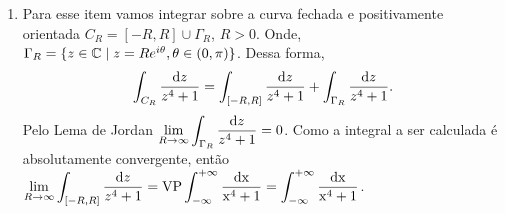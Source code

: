 \begin{questions}
%
\begin{solution}
\begin{enumerate}[label=(\alph*)]
      \item Para esse item vamos integrar sobre a curva fechada e positivamente orientada $C_R = [-R,R] \cup \Gamma_R$, $R>0$. Onde, $\Gamma_R = \{z\in{\mathbb C} \mid z = R e^{i\theta}, \theta\in(0,\pi)\}$.
      Dessa forma,
      \begin{align*}
        \int_{C_R} \frac{\mathrm{d} z}{z^4 + 1} = \int_{[-R,R]} \frac{\mathrm{d} z}{z^4 + 1} + \int_{\Gamma_R} \frac{\mathrm{d} z}{z^4 + 1}.
      \end{align*}
      Pelo Lema de Jordan $\displaystyle \lim_{R\to\infty} \int_{\Gamma_R} \frac{\mathrm{d} z}{z^4 + 1} = 0$. Como a integral a ser calculada é absolutamente convergente, então $\displaystyle \lim_{R\to\infty} \int_{[-R,R]} \frac{\mathrm{d} z}{z^4 + 1} = \rm{VP} \int_{-\infty}^{+\infty} \frac{\mathrm{d} x}{x^4 + 1} = \int_{-\infty}^{+\infty} \frac{\mathrm{d} x}{x^4 + 1}$.\\

\end{enumerate}
\end{solution}
\end{questions}
